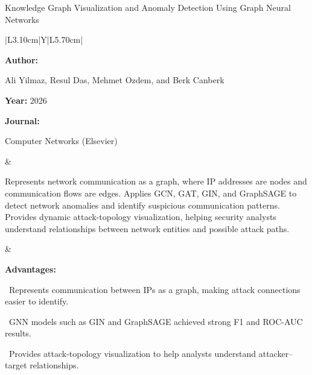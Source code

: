 \begin{frame}[t]{Knowledge Graph Visualization and Anomaly Detection Using Graph Neural Networks}
\vspace{-0.30em}
{\footnotesize\setlength{\tabcolsep}{3.5pt}\renewcommand{\arraystretch}{1.10}
\begin{tabularx}{\textwidth}{|L{3.10cm}|Y|L{5.70cm}|}
\hline\lrhdr\hline
\begin{minipage}[t]{\linewidth}\fontsize{7.2pt}{9.2pt}\raggedright\selectfont
\textbf{Author:}\par
Ali Yilmaz, Resul Das, Mehmet Ozdem, and Berk Canberk\par\vspace{4pt}
\textbf{Year:} 2026\par\vspace{4pt}
\textbf{Journal:}\par
Computer Networks (Elsevier)\par\vspace{4pt}
\end{minipage}
&
\begin{minipage}[t]{\linewidth}\fontsize{7.1pt}{9.1pt}\raggedright\selectfont
Represents network communication as a graph, where IP addresses are nodes and communication flows are edges. Applies GCN, GAT, GIN, and GraphSAGE to detect network anomalies and identify suspicious communication patterns. Provides dynamic attack-topology visualization, helping security analysts understand relationships between network entities and possible attack paths.\par\vspace{4pt}
\end{minipage}
&
\begin{minipage}[t]{\linewidth}\fontsize{6.8pt}{8.4pt}\raggedright\selectfont
\textcolor{strengthGreen}{\textbf{Advantages:}}\par\vspace{1.3pt}
\textbullet~Represents communication between IPs as a graph, making attack connections easier to identify.\par\vspace{1.8pt}\textbullet~GNN models such as GIN and GraphSAGE achieved strong F1 and ROC-AUC results.\par\vspace{1.8pt}\textbullet~Provides attack-topology visualization to help analysts understand attacker--target relationships.\par\vspace{3.2pt}

\end{minipage}
\end{tabularx}}
\end{frame}
